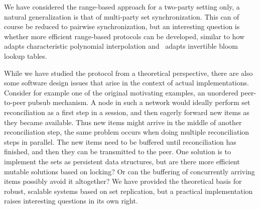 We have considered the range-based approach for a two-party setting only, a natural generalization is that of multi-party set synchronization. This can of course be reduced to pairwise synchronization, but an interesting question is whether more efficient range-based protocols can be developed, similar to how~\cite{boral2014multi} adapts characteristic polynomial interpolation and~\cite{mitzenmacher2018simple} adapts invertible bloom lookup tables.

While we have studied the protocol from a theoretical perspective, there are also some software design issues that arise in the context of actual implementations. Consider for example one of the original motivating examples, an unordered peer-to-peer pubsub mechanism. A node in such a network would ideally perform set reconciliation as a first step in a session, and then eagerly forward new items as they became available. Thus new items might arrive in the middle of another reconciliation step, the same problem occurs when doing multiple reconciliation steps in parallel. The new items need to be buffered until reconciliation has finished, and then they can be transmitted to the peer. One solution is to implement the sets as persistent data structures, but are there more efficient mutable solutions based on locking? Or can the buffering of concurrently arriving items possibly avoid it altogether? We have provided the theoretical basis for robust, scalable systems based on set replication, but a practical implementation raises interesting questions in its own right.
